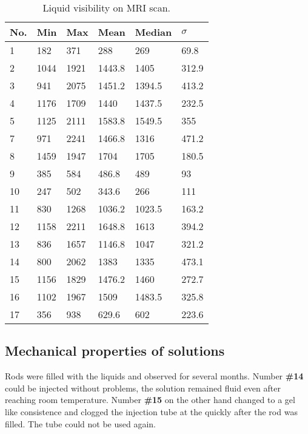 \begin{table}[!htb]
\centering
\caption{Liquid visibility on MRI scan.}
\begin{tabular}{@{}l|lllll@{}}
\toprule
No. & Min  & Max  & Mean   & Median & $\sigma$ \\ \midrule
1   & 182  & 371  & 288    & 269    & 69.8     \\
2   & 1044 & 1921 & 1443.8 & 1405   & 312.9    \\
3   & 941  & 2075 & 1451.2 & 1394.5 & 413.2    \\
4   & 1176 & 1709 & 1440   & 1437.5 & 232.5    \\
5   & 1125 & 2111 & 1583.8 & 1549.5 & 355      \\
7   & 971  & 2241 & 1466.8 & 1316   & 471.2    \\
8   & 1459 & 1947 & 1704   & 1705   & 180.5    \\
9   & 385  & 584  & 486.8  & 489    & 93       \\
10  & 247  & 502  & 343.6  & 266    & 111      \\
11  & 830  & 1268 & 1036.2 & 1023.5 & 163.2    \\
12  & 1158 & 2211 & 1648.8 & 1613   & 394.2    \\
13  & 836  & 1657 & 1146.8 & 1047   & 321.2    \\
14  & 800  & 2062 & 1383   & 1335   & 473.1    \\
15  & 1156 & 1829 & 1476.2 & 1460   & 272.7    \\
16  & 1102 & 1967 & 1509   & 1483.5 & 325.8    \\
17  & 356  & 938  & 629.6  & 602    & 223.6    \\ \bottomrule
\end{tabular}
\label{tab:visibility}
\end{table}

\clearpage

\subsection{Mechanical properties of solutions}
\label{sec:sol-mech}

Rods were filled with the liquids and observed for several months.
Number \textbf{\#14} could be injected without problems, the solution remained fluid even after reaching room temperature.
Number \textbf{\#15} on the other hand changed to a gel like consistence and clogged the injection tube at the quickly after the rod was filled.
The tube could not be used again.

